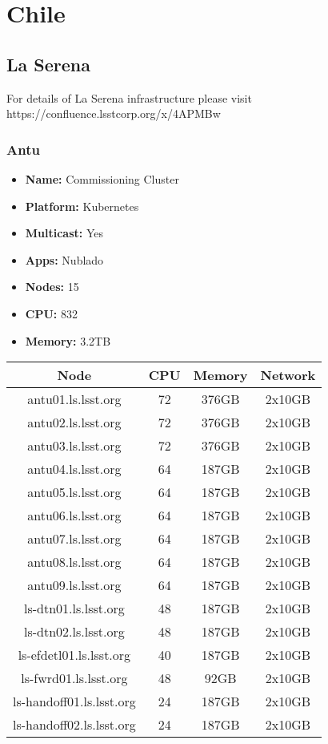\section{Chile}
\subsection{La Serena}
For details of La Serena infrastructure please visit https://confluence.lsstcorp.org/x/4APMBw
\subsubsection{Antu}
\begin{itemize}
  \itemsep0em 
  \item \textbf{Name:}      Commissioning Cluster
  \item \textbf{Platform:}  Kubernetes
  \item \textbf{Multicast:} Yes
  \item \textbf{Apps:}      Nublado
  \item \textbf{Nodes:}     15
  \item \textbf{CPU:}       832
  \item \textbf{Memory:}    3.2TB
\end{itemize}
\begin{center}
  \small
  \begin{tabular}{||c c c c||} 
    \hline
    \textbf{Node} & \textbf{CPU} & \textbf{Memory} & \textbf{Network} \\ [0.5ex]
    \hline
    antu01.ls.lsst.org & 72 & 376GB & 2x10GB \\
    \hline
    antu02.ls.lsst.org & 72 & 376GB & 2x10GB \\
    \hline
    antu03.ls.lsst.org & 72 & 376GB & 2x10GB \\
    \hline
    antu04.ls.lsst.org & 64 & 187GB & 2x10GB \\
    \hline
    antu05.ls.lsst.org & 64 & 187GB & 2x10GB \\
    \hline
    antu06.ls.lsst.org & 64 & 187GB & 2x10GB \\
    \hline
    antu07.ls.lsst.org & 64 & 187GB & 2x10GB \\
    \hline
    antu08.ls.lsst.org & 64 & 187GB & 2x10GB \\
    \hline
    antu09.ls.lsst.org & 64 & 187GB & 2x10GB \\
    \hline
    ls-dtn01.ls.lsst.org & 48 & 187GB & 2x10GB \\
    \hline
    ls-dtn02.ls.lsst.org & 48 & 187GB & 2x10GB \\
    \hline
    ls-efdetl01.ls.lsst.org & 40 & 187GB & 2x10GB \\
    \hline
    ls-fwrd01.ls.lsst.org & 48 & 92GB & 2x10GB \\
    \hline
    ls-handoff01.ls.lsst.org & 24 & 187GB & 2x10GB \\
    \hline
    ls-handoff02.ls.lsst.org & 24 & 187GB & 2x10GB \\
    \hline
  \end{tabular}
\end{center}

